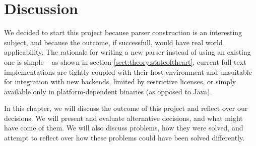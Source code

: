 \chapter{Discussion}
\label{chapter:discussion}
We decided to start this project because parser construction is an interesting
subject, and because the outcome, if successfull, would have real world
applicability. The rationale for writing a new parser instead of using an
existing one is simple -- as shown in section \ref{sect:theory:stateoftheart},
current full-text implementations are tightly coupled with their
host environment and unsuitable for integration with new backends, limited by
restrictive licenses, or simply available only in platform-dependent binaries
(as opposed to Java). 

In this chapter, we will discuss the outcome of this project and reflect over
our decisions. We will present and evaluate alternative decisions, and what
might have come of them. We will also discuss problems, how they were
solved, and attempt to reflect over how these problems could have been solved
differently.






















